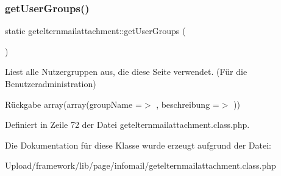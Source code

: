 \mbox{\label{classgetelternmailattachment_a9abd1214faa4f57f3b68a4089ff9a660}} 
\subsubsection{\texorpdfstring{get\+User\+Groups()}{getUserGroups()}}
{\footnotesize\ttfamily static getelternmailattachment\+::get\+User\+Groups (\begin{DoxyParamCaption}{ }\end{DoxyParamCaption})\hspace{0.3cm}{\ttfamily [static]}}

Liest alle Nutzergruppen aus, die diese Seite verwendet. (Für die Benutzeradministration) \begin{DoxyReturn}{Rückgabe}
array(array(\textquotesingle{}group\+Name\textquotesingle{} =$>$ \textquotesingle{}\textquotesingle{}, \textquotesingle{}beschreibung\textquotesingle{} =$>$ \textquotesingle{}\textquotesingle{})) 
\end{DoxyReturn}


Definiert in Zeile 72 der Datei getelternmailattachment.\+class.\+php.



Die Dokumentation für diese Klasse wurde erzeugt aufgrund der Datei\+:\begin{DoxyCompactItemize}
\item 
Upload/framework/lib/page/infomail/getelternmailattachment.\+class.\+php\end{DoxyCompactItemize}
